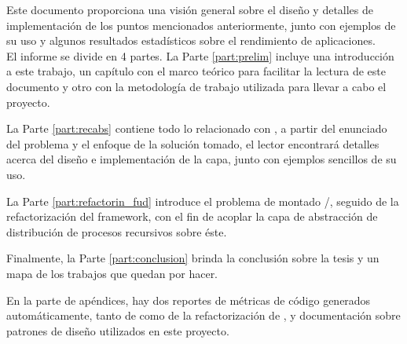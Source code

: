 Este documento proporciona una visión general sobre el diseño y detalles de implementación de los puntos mencionados anteriormente, junto
con ejemplos de su uso y algunos resultados estadísticos sobre el rendimiento de aplicaciones.\\

El informe se divide en 4 partes. La Parte \ref{part:prelim} incluye una introducción a este trabajo, un capítulo con el marco teórico para
facilitar la lectura de este documento y otro con la metodología de trabajo utilizada para llevar a cabo el proyecto.

La Parte \ref{part:recabs} contiene todo lo relacionado con \rc, a partir del enunciado del problema y el enfoque de la solución tomado, el
lector encontrará detalles acerca del diseño e implementación de la capa, junto con ejemplos sencillos de su uso.

La Parte \ref{part:refactorin_fud} introduce el problema de montado \rc/\fud, seguido de la refactorización del framework, con el fin de
acoplar la capa de abstracción de distribución de procesos recursivos sobre éste.

Finalmente, la Parte \ref{part:conclusion} brinda la conclusión sobre la tesis y un mapa de los trabajos que quedan por hacer.

En la parte de apéndices, hay dos reportes de métricas de código generados automáticamente, tanto de \rc{} como de la refactorización de
\fud, y documentación sobre patrones de diseño utilizados en este proyecto.
